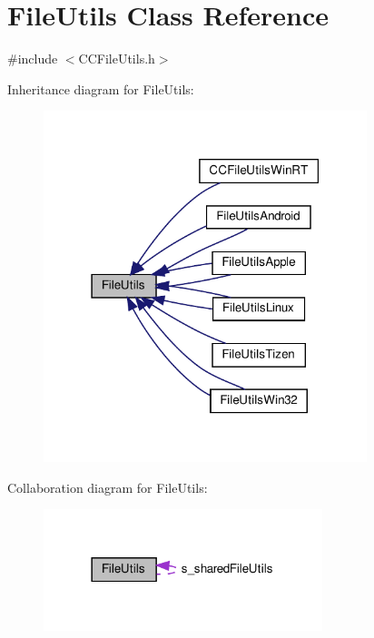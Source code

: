 \hypertarget{classFileUtils}{}\section{File\+Utils Class Reference}
\label{classFileUtils}


{\ttfamily \#include $<$C\+C\+File\+Utils.\+h$>$}



Inheritance diagram for File\+Utils\+:
\nopagebreak
\begin{figure}[H]
\begin{center}
\leavevmode
\includegraphics[width=267pt]{classFileUtils__inherit__graph}
\end{center}
\end{figure}


Collaboration diagram for File\+Utils\+:
\nopagebreak
\begin{figure}[H]
\begin{center}
\leavevmode
\includegraphics[width=230pt]{classFileUtils__coll__graph}
\end{center}
\end{figure}
